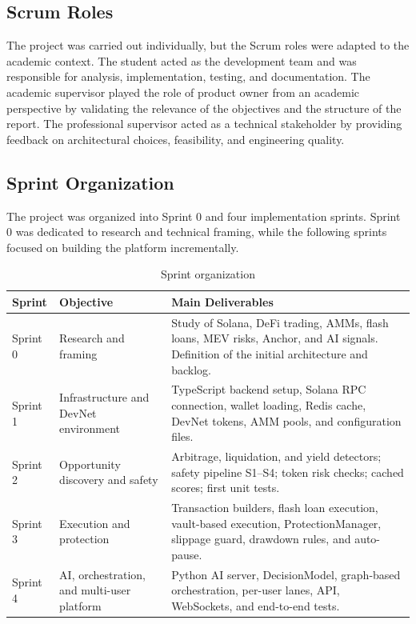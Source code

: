 \documentclass[12pt,a4paper]{report}
\begin{document}
\subsection{Scrum Roles}

The project was carried out individually, but the Scrum roles were adapted to the academic context. The student acted as the development team and was responsible for analysis, implementation, testing, and documentation. The academic supervisor played the role of product owner from an academic perspective by validating the relevance of the objectives and the structure of the report. The professional supervisor acted as a technical stakeholder by providing feedback on architectural choices, feasibility, and engineering quality.

\subsection{Sprint Organization}

The project was organized into Sprint 0 and four implementation sprints. Sprint 0 was dedicated to research and technical framing, while the following sprints focused on building the platform incrementally.

\begin{table}[H]
\centering
\begin{tabularx}{\textwidth}{lX X}
\toprule
\textbf{Sprint} & \textbf{Objective} & \textbf{Main Deliverables} \\
\midrule
Sprint 0 & Research and framing & Study of Solana, DeFi trading, AMMs, flash loans, MEV risks, Anchor, and AI signals. Definition of the initial architecture and backlog. \\
Sprint 1 & Infrastructure and DevNet environment & TypeScript backend setup, Solana RPC connection, wallet loading, Redis cache, DevNet tokens, AMM pools, and configuration files. \\
Sprint 2 & Opportunity discovery and safety & Arbitrage, liquidation, and yield detectors; safety pipeline S1--S4; token risk checks; cached scores; first unit tests. \\
Sprint 3 & Execution and protection & Transaction builders, flash loan execution, vault-based execution, ProtectionManager, slippage guard, drawdown rules, and auto-pause. \\
Sprint 4 & AI, orchestration, and multi-user platform & Python AI server, DecisionModel, graph-based orchestration, per-user lanes, API, WebSockets, and end-to-end tests. \\
\bottomrule
\end{tabularx}
\caption{Sprint organization}
\label{tab:sprints}
\end{table}
\end{document}
